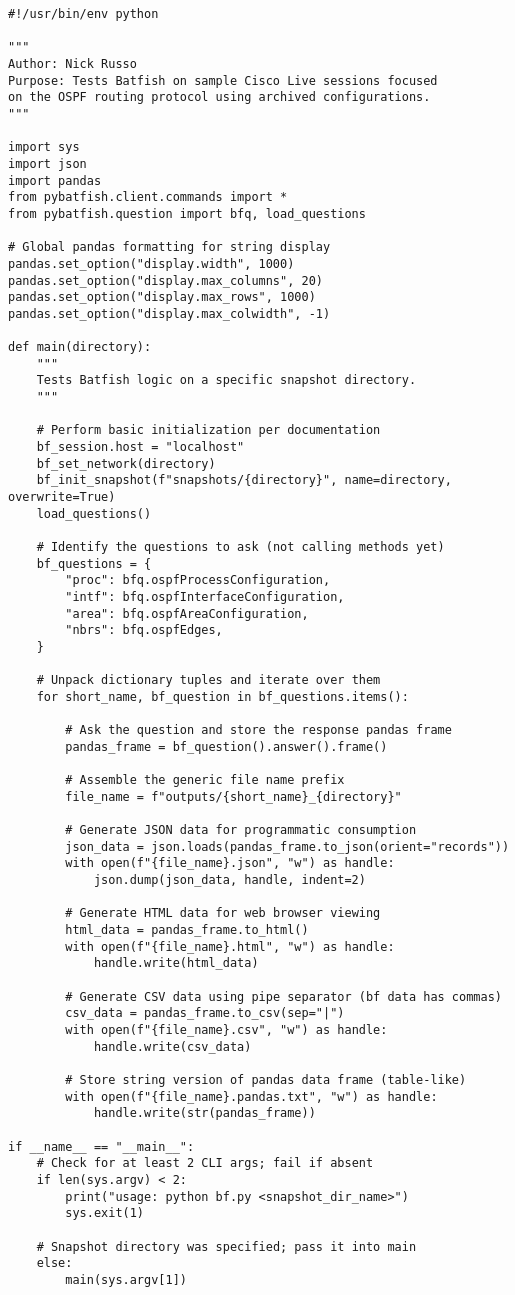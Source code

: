 \begin{verbatim}
#!/usr/bin/env python

"""
Author: Nick Russo
Purpose: Tests Batfish on sample Cisco Live sessions focused
on the OSPF routing protocol using archived configurations.
"""

import sys
import json
import pandas
from pybatfish.client.commands import *
from pybatfish.question import bfq, load_questions

# Global pandas formatting for string display
pandas.set_option("display.width", 1000)
pandas.set_option("display.max_columns", 20)
pandas.set_option("display.max_rows", 1000)
pandas.set_option("display.max_colwidth", -1)

def main(directory):
    """
    Tests Batfish logic on a specific snapshot directory.
    """

    # Perform basic initialization per documentation
    bf_session.host = "localhost"
    bf_set_network(directory)
    bf_init_snapshot(f"snapshots/{directory}", name=directory, overwrite=True)
    load_questions()

    # Identify the questions to ask (not calling methods yet)
    bf_questions = {
        "proc": bfq.ospfProcessConfiguration,
        "intf": bfq.ospfInterfaceConfiguration,
        "area": bfq.ospfAreaConfiguration,
        "nbrs": bfq.ospfEdges,
    }

    # Unpack dictionary tuples and iterate over them
    for short_name, bf_question in bf_questions.items():

        # Ask the question and store the response pandas frame
        pandas_frame = bf_question().answer().frame()

        # Assemble the generic file name prefix
        file_name = f"outputs/{short_name}_{directory}"

        # Generate JSON data for programmatic consumption
        json_data = json.loads(pandas_frame.to_json(orient="records"))
        with open(f"{file_name}.json", "w") as handle:
            json.dump(json_data, handle, indent=2)

        # Generate HTML data for web browser viewing
        html_data = pandas_frame.to_html()
        with open(f"{file_name}.html", "w") as handle:
            handle.write(html_data)

        # Generate CSV data using pipe separator (bf data has commas)
        csv_data = pandas_frame.to_csv(sep="|")
        with open(f"{file_name}.csv", "w") as handle:
            handle.write(csv_data)

        # Store string version of pandas data frame (table-like)
        with open(f"{file_name}.pandas.txt", "w") as handle:
            handle.write(str(pandas_frame))

if __name__ == "__main__":
    # Check for at least 2 CLI args; fail if absent
    if len(sys.argv) < 2:
        print("usage: python bf.py <snapshot_dir_name>")
        sys.exit(1)

    # Snapshot directory was specified; pass it into main
    else:
        main(sys.argv[1])
\end{verbatim}

